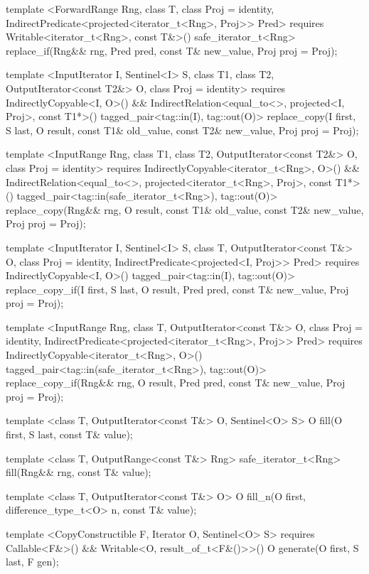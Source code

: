 \begin{codeblock}
{{{{  template <ForwardRange Rng, class T, class Proj = identity,
      IndirectPredicate<projected<iterator_t<Rng>, Proj>> Pred>
    requires Writable<iterator_t<Rng>, const T&>()
    safe_iterator_t<Rng>
      replace_if(Rng&& rng, Pred pred, const T& new_value, Proj proj = Proj{});

  template <InputIterator I, Sentinel<I> S, class T1, class T2, OutputIterator<const T2&> O,
      class Proj = identity>
    requires IndirectlyCopyable<I, O>() &&
      IndirectRelation<equal_to<>, projected<I, Proj>, const T1*>()
    tagged_pair<tag::in(I), tag::out(O)>
      replace_copy(I first, S last, O result, const T1& old_value, const T2& new_value,
                   Proj proj = Proj{});

  template <InputRange Rng, class T1, class T2, OutputIterator<const T2&> O,
      class Proj = identity>
    requires IndirectlyCopyable<iterator_t<Rng>, O>() &&
      IndirectRelation<equal_to<>, projected<iterator_t<Rng>, Proj>, const T1*>()
    tagged_pair<tag::in(safe_iterator_t<Rng>), tag::out(O)>
      replace_copy(Rng&& rng, O result, const T1& old_value, const T2& new_value,
                   Proj proj = Proj{});

  template <InputIterator I, Sentinel<I> S, class T, OutputIterator<const T&> O,
      class Proj = identity, IndirectPredicate<projected<I, Proj>> Pred>
    requires IndirectlyCopyable<I, O>()
    tagged_pair<tag::in(I), tag::out(O)>
      replace_copy_if(I first, S last, O result, Pred pred, const T& new_value,
                      Proj proj = Proj{});

  template <InputRange Rng, class T, OutputIterator<const T&> O, class Proj = identity,
      IndirectPredicate<projected<iterator_t<Rng>, Proj>> Pred>
    requires IndirectlyCopyable<iterator_t<Rng>, O>()
    tagged_pair<tag::in(safe_iterator_t<Rng>), tag::out(O)>
      replace_copy_if(Rng&& rng, O result, Pred pred, const T& new_value,
                      Proj proj = Proj{});

  template <class T, OutputIterator<const T&> O, Sentinel<O> S>
    O fill(O first, S last, const T& value);

  template <class T, OutputRange<const T&> Rng>
    safe_iterator_t<Rng>
      fill(Rng&& rng, const T& value);

  template <class T, OutputIterator<const T&> O>
    O fill_n(O first, difference_type_t<O> n, const T& value);

  template <CopyConstructible F, Iterator O, Sentinel<O> S>
      requires Callable<F&>() && Writable<O, result_of_t<F&()>>()
    O generate(O first, S last, F gen);

}}}}
\end{codeblock}
